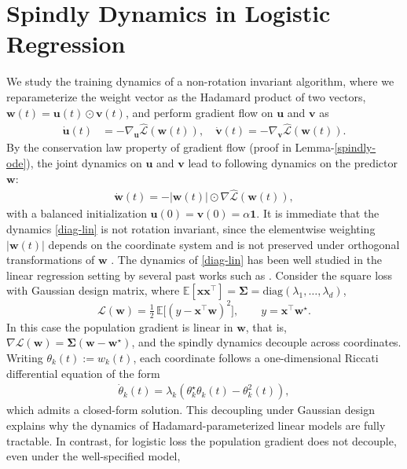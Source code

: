 \documentclass{article}
\theoremstyle{plain}
\theoremstyle{definition}
\theoremstyle{remark}
\begin{document}
\section{Spindly Dynamics in Logistic Regression}
\label{sec-spindly}
We study the training dynamics of a non-rotation invariant algorithm, where we reparameterize the weight vector as the Hadamard product of two vectors, $\mathbf{w}(t)=\mathbf{u}(t)\odot\mathbf{v}(t)$, and perform gradient flow on $\mathbf{u}$ and $\mathbf{v}$ as 
\begin{align}
\label{diag-lin}
\dot{\mathbf{u}}(t)
&=
- \nabla_{\mathbf{u}}
\widehat{\mathcal{L}}(\mathbf{w}(t)),
\quad
\dot{\mathbf{v}}(t)
=
- \nabla_{\mathbf{v}}
\widehat{\mathcal{L}}(\mathbf{w}(t)).
\end{align}
By the conservation law property of gradient flow (proof in Lemma-\ref{spindly-ode}), the joint dynamics on $\mathbf{u}$ and $\mathbf{v}$ lead to following dynamics on the predictor $\mathbf{w}$:
\begin{align}
\label{spindly-ode}
    \dot{\mathbf{w}}(t) = -|\mathbf{w}(t)| \odot \nabla \widehat{\mathcal{L}}(\mathbf{w}(t)),
\end{align}
with a balanced initialization $\mathbf{u}(0)=\mathbf{v}(0)=\alpha \mathbf{1}$. It is immediate that the dynamics \eqref{diag-lin} is not rotation invariant, since the elementwise weighting $|\mathbf w(t)|$ depends on the coordinate system and is not preserved under orthogonal transformations of $\mathbf w$ . The dynamics of \eqref{diag-lin} has been well studied in the linear regression setting by several past works such as \cite{saxe2013exact,pesme2023saddle,jacot2021saddle}. Consider the square loss with Gaussian design matrix, where  $\mathbb E[\mathbf x\mathbf x^\top]=\boldsymbol\Sigma=\mathrm{diag}(\lambda_1,\dots,\lambda_d)$,
\[
\mathcal L(\mathbf w)=\tfrac12\,\mathbb E\big[(y-\mathbf x^\top \mathbf w)^2\big],
\qquad
y=\mathbf x^\top \mathbf w^\star.
\]
In this case the population gradient is linear in $\mathbf{w}$, that is, 
$\nabla \mathcal L(\mathbf w)=\boldsymbol\Sigma(\mathbf w-\mathbf w^\star)$,
and the spindly dynamics decouple across coordinates.
Writing $\theta_k(t):=w_k(t)$, each coordinate follows a one-dimensional Riccati differential equation of the form
\begin{align}
\label{decouple-riccati}
\dot\theta_k(t)
=
\lambda_k (\theta_k^\star \theta_k(t)- \theta^{2}_k(t)),
\end{align}
which admits a closed-form solution.
This decoupling under Gaussian design explains why the dynamics of Hadamard-parameterized linear models are fully tractable. In contrast, for logistic loss the population gradient does not decouple, even under the well-specified model,
\end{document}

